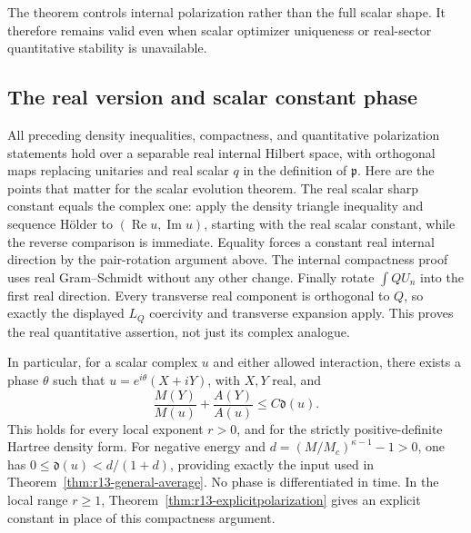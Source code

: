 The theorem controls internal polarization rather than the full
scalar shape. It therefore remains valid even when scalar optimizer
uniqueness or real-sector quantitative stability is unavailable.


\subsection{The real version and scalar constant phase}
\label{subsec:r13-real-phase}
All preceding density inequalities, compactness, and quantitative
polarization statements hold over a separable real internal Hilbert
space, with orthogonal maps replacing unitaries and real scalar $q$
in the definition of $\mathfrak p$. Here are the points that matter
for the scalar evolution theorem. The real scalar sharp constant
equals the complex one: apply the density triangle inequality and
sequence H\"older to $(\operatorname{Re}u,\operatorname{Im}u)$,
starting with the real scalar constant, while the reverse comparison
is immediate. Equality forces a constant real internal direction
by the pair-rotation argument above. The internal compactness proof
uses real Gram--Schmidt without any other change. Finally rotate
$\int QU_n$ into the first real direction. Every transverse real
component is orthogonal to $Q$, so exactly the displayed $L_Q$
coercivity and transverse expansion apply. This proves the real
quantitative assertion, not just its complex analogue.

In particular, for a scalar complex $u$ and either allowed interaction,
there exists a phase $\theta$ such that $u=e^{i\theta}(X+iY)$,
with $X,Y$ real, and
\[
 \frac{M(Y)}{M(u)}+\frac{A(Y)}{A(u)}\le C\mathfrak d(u).
\]
This holds for every local exponent $r>0$, and for the strictly
positive-definite Hartree density form. For negative energy and
$d=(M/M_c)^{\kappa-1}-1>0$, one has
$0\le\mathfrak d(u)<d/(1+d)$, providing exactly the input used
in Theorem~\ref{thm:r13-general-average}. No phase is differentiated
in time. In the local range $r\ge1$,
Theorem~\ref{thm:r13-explicitpolarization} gives an explicit constant
in place of this compactness argument.
